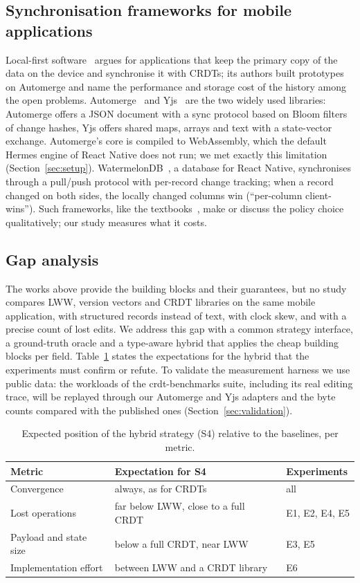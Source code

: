 \subsection{Synchronisation frameworks for mobile applications}
Local-first software~\cite{kleppmann2019localfirst} argues for applications that keep the primary copy of the data
on the device and synchronise it with CRDTs; its authors built prototypes on Automerge and name the performance and
storage cost of the history among the open problems. Automerge~\cite{automergedocs} and Yjs~\cite{yjsdocs} are the two
widely used libraries: Automerge offers a JSON document with a sync protocol based on Bloom filters of change hashes,
Yjs offers shared maps, arrays and text with a state-vector exchange. Automerge's core is compiled to WebAssembly,
which the default Hermes engine of React Native does not run; we met exactly this limitation
(Section~\ref{sec:setup}). WatermelonDB~\cite{watermelondbdocs}, a database for React Native, synchronises through a
pull/push protocol with per-record change tracking; when a record changed on both sides, the locally changed columns
win (``per-column client-wins''). Such frameworks, like the textbooks~\cite{kleppmann2017ddia,vansteen2017distributed},
make or discuss the policy choice qualitatively; our study measures what it costs.

\subsection{Gap analysis}
The works above provide the building blocks and their guarantees, but no study compares LWW, version vectors and CRDT libraries on the same mobile application, with
structured records instead of text, with clock skew, and with a precise count of lost edits. We address this gap with
a common strategy interface, a ground-truth oracle and a type-aware hybrid that applies the cheap building blocks per
field. Table~\ref{tab:expectations} states the expectations for the hybrid that the experiments must confirm or
refute. To validate the measurement harness we use public data: the workloads of the crdt-benchmarks suite,
including its real editing trace, will be replayed through our Automerge and Yjs adapters and the byte counts compared
with the published ones (Section~\ref{sec:validation}).

\begin{table}[ht]
\caption{Expected position of the hybrid strategy (S4) relative to the baselines, per metric.}
\label{tab:expectations}
\small
\begin{tabular}{@{}lll@{}}
\toprule
Metric & Expectation for S4 & Experiments \\
\midrule
Convergence & always, as for CRDTs & all \\
Lost operations & far below LWW, close to a full CRDT & E1, E2, E4, E5 \\
Payload and state size & below a full CRDT, near LWW & E3, E5 \\
Implementation effort & between LWW and a CRDT library & E6 \\
\bottomrule
\end{tabular}
\end{table}
